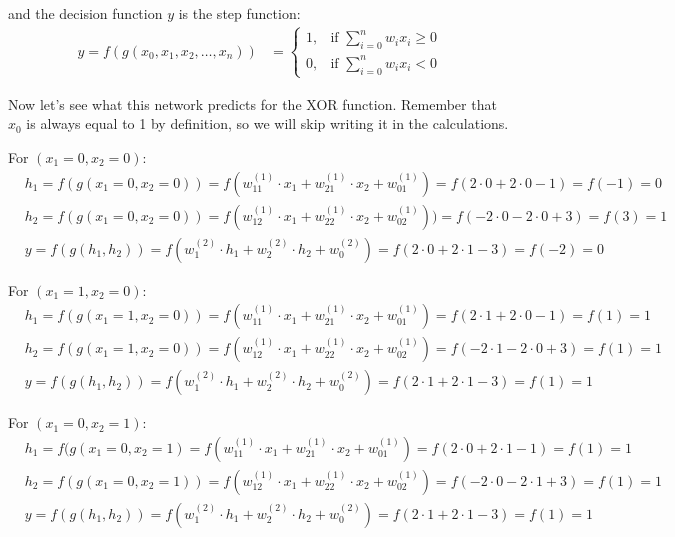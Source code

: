 and the decision function $y$ is the step function:
{\setlength{\jot}{10pt}
\begin{align*}
y = f(g(x_0, x_1, x_2, \ldots, x_n)) &=
\begin{cases}
1, & \text{if } \sum_{i=0}^{n} w_i x_i \geq 0 \\ 0, & \text{if } \sum_{i=0}^{n} w_i x_i < 0
\end{cases}
\end{align*}}

Now let's see what this network predicts for the XOR function. Remember that $x_0$ is always equal to 1 by
definition, so we will skip writing it in the calculations.
\bit
\item For $(x_1 = 0, x_2 = 0)$:
\begin{align*}
&h_1 = f(g(x_1 = 0, x_2 = 0)) = f(w^{(1)}_{11} \cdot x_1
+ w^{(1)}_{21} \cdot x_2 + w^{(1)}_{01}) = f(2 \cdot 0 + 2 \cdot 0 - 1) = f(-1) = 0 \\
&h_2 = f(g(x_1 = 0, x_2 = 0)) = f(w^{(1)}_{12} \cdot x_1
+ w^{(1)}_{22} \cdot x_2 + w^{(1)}_{02})) = f(-2 \cdot 0 - 2 \cdot 0 + 3) = f(3) = 1 \\
&y = f(g(h_1, h_2)) = f(w^{(2)}_{1} \cdot h_1
+ w^{(2)}_{2} \cdot h_2 + w_{0}^{(2)}) = f(2 \cdot 0 + 2 \cdot 1 -3) = f(-2) = 0
\end{align*}

\item For $(x_1 = 1, x_2 = 0)$:
\begin{align*}
&h_1 = f(g(x_1 = 1, x_2 = 0)) = f(w^{(1)}_{11} \cdot x_1
+ w^{(1)}_{21} \cdot x_2 + w^{(1)}_{01}) = f(2 \cdot 1 + 2 \cdot 0 - 1) = f(1) = 1 \\
&h_2 = f(g(x_1 = 1, x_2 = 0)) = f(w^{(1)}_{12} \cdot x_1
+ w^{(1)}_{22} \cdot x_2 + w^{(1)}_{02}) = f(-2 \cdot 1 - 2 \cdot 0 + 3) = f(1) = 1 \\
&y = f(g(h_1, h_2)) = f(w^{(2)}_{1} \cdot h_1
+ w^{(2)}_{2} \cdot h_2 + w_{0}^{(2)}) = f(2 \cdot 1 + 2 \cdot 1 - 3) = f(1) = 1
\end{align*}

\item For $(x_1 = 0, x_2 = 1)$:
\begin{align*}
&h_1 = f(g(x_1 = 0, x_2 = 1) = f(w^{(1)}_{11} \cdot x_1
+ w^{(1)}_{21} \cdot x_2 + w^{(1)}_{01}) = f(2 \cdot 0 + 2 \cdot 1 - 1) = f(1) = 1 \\
&h_2 = f(g(x_1 = 0, x_2 = 1)) = f(w^{(1)}_{12} \cdot x_1
+ w^{(1)}_{22} \cdot x_2 + w^{(1)}_{02}) = f(-2 \cdot 0 - 2 \cdot 1 + 3) = f(1) = 1 \\
&y = f(g(h_1, h_2)) = f(w^{(2)}_{1} \cdot h_1
+ w^{(2)}_{2} \cdot h_2 + w_{0}^{(2)}) = f(2 \cdot 1 + 2 \cdot 1 - 3) = f(1) = 1
\end{align*}

